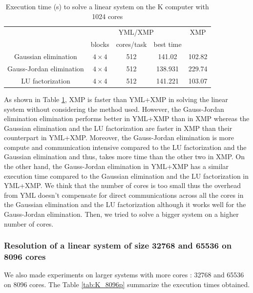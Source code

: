 \begin{table}[h]
	\caption{Execution time (s) to solve a linear system on the K computer with 1024 cores\label{tab:K_1024p_16384n}}
	\centering
	\begin{tabular}{ccccc}
		                         &      \multicolumn{3}{c}{YML/XMP}      &  XMP   \\
		                         &    blocks    & cores/task & best time &        \\ \hline
		  Gaussian elimination   & $4 \times 4$ &    512     &  141.02   & 102.82 \\
		Gauss-Jordan elimination & $4 \times 4$ &    512     &  138.931  & 229.74 \\
		    LU factorization     & $4 \times 4$ &    512     &  141.221  & 103.07
	\end{tabular}
\end{table}


As shown in Table \ref{tab:K_1024p_16384n}, XMP is faster than YML+XMP in solving the linear system without considering the method used.
However, the Gauss-Jordan elimination elimination performs better in YML+XMP than in XMP whereas the Gaussian elimination and the LU factorization are faster in XMP than their counterpart in YML+XMP.
Moreover, the Gauss-Jordan elimination is more compute and communication intensive compared to the LU factorization and the Gaussian elimination and thus, takes more time than the other two in XMP.
On the other hand, the Gauss-Jordan elimination in YML+XMP has a similar execution time compared to the Gaussian elimination and the LU factorization in YML+XMP.
We think that the number of cores is too small thus the overhead from YML doesn't compensate for direct communications across all the cores in the Gaussian elimination and the LU factorization although it works well for the Gauss-Jordan elimination.
Then, we tried to solve a bigger system on a higher number of cores.


\subsubsection{Resolution of a linear system of size 32768 and 65536 on 8096 cores}
We also made experiments on larger systems with more cores : 32768 and 65536 on 8096 cores.
The Table \ref{tab:K_8096p} summarize the execution times obtained.

